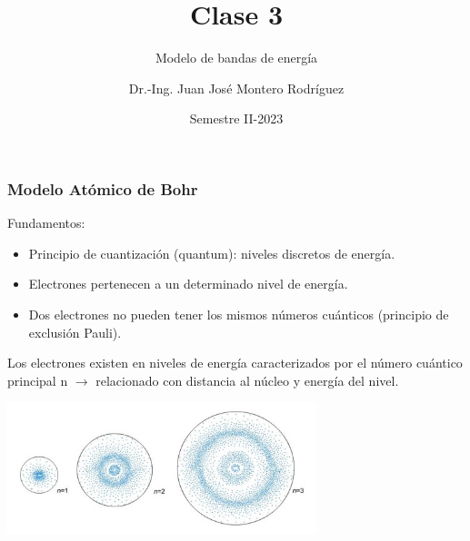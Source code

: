 \documentclass[10pt,t,aspectratio=169]{beamer}
\title{Clase 3}
\subtitle{Modelo de bandas de energía}
\author{Dr.-Ing. Juan José Montero Rodríguez}
\institute{Escuela de Ingeniería Electrónica}
\date{Semestre II-2023}
\begin{document}
\begin{frame}[t]
\titlepage
\end{frame}



\begin{frame}[t]
    \frametitle{Modelo Atómico de Bohr}

    Fundamentos:
    \begin{itemize}
        \item Principio de cuantización (quantum): niveles discretos de energía.
        \item Electrones pertenecen a un determinado nivel de energía.
        \item Dos electrones no pueden tener los mismos números cuánticos (principio de exclusión Pauli).
    \end{itemize}

    Los electrones existen en niveles de energía caracterizados por el número cuántico principal n $\rightarrow$ relacionado con distancia al núcleo y energía del nivel.

    \centering
    \includegraphics[width=9cm]{./figures/modelo-bohr.jpg}
\end{frame}
\end{document}
